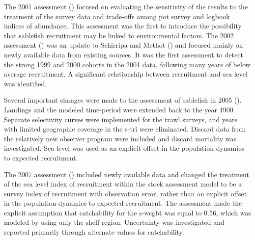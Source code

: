 \documentclass[
  english,
]{article}
\begin{document}
The 2001 assessment () focused on evaluating the sensitivity of the results to
the treatment of the survey data and trade-offs among pot survey and
logbook indices of abundance. This assessment was the first to introduce
the possibility that sablefish recruitment may be linked to
environmental factors. The 2002 assessment
() was an update to
Schirripa and Methot () and
focused mainly on newly available data from existing sources. It was the
first assessment to detect the strong 1999 and 2000 cohorts in the 2001
data, following many years of below average recruitment. A significant
relationship between recruitment and sea level was identified.

Several important changes were made to the assessment of sablefish in
2005 (). Landings and the modeled time-period were extended back to the
year 1900. Separate selectivity curves were implemented for the trawl
surveys, and years with limited geographic coverage in the \gls{s-tri}
were eliminated. Discard data from the relatively new observer program
were included and discard mortality was investigated. Sea level was used
as an explicit offset in the population dynamics to expected
recruitment.

The 2007 assessment () included newly available data and changed the treatment of the
sea level index of recruitment within the stock assessment model to be a
survey index of recruitment with observation error, rather than an
explicit offset in the population dynamics to expected recruitment. The
assessment made the explicit assumption that catchability for the
\gls{s-wcgbt} was equal to 0.56, which was modeled by using only the
shelf region. Uncertainty was investigated and reported primarily
through alternate values for catchability.
\end{document}

